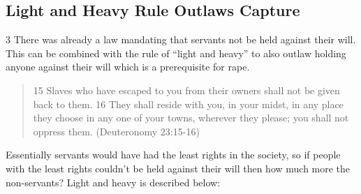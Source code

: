 \documentclass[11pt]{article}
\begin{document}
\subsection{Light and Heavy Rule Outlaws Capture}
3 There was already a law mandating that servants not be held against their will. This can be combined with the rule of “light and heavy” to also outlaw holding anyone against their will which is a prerequisite for rape.
\begin{quote}
15 Slaves who have escaped to you from their owners shall not be given back to them. 16 They shall reside with you, in your midst, in any place they choose in any one of your towns, wherever they please; you shall not oppress them. (Deuteronomy 23:15-16)
\end{quote}
Essentially servants would have had the least rights in the society, so if people with the least rights couldn’t be held against their will then how much more the non-servants? Light and heavy is described below:
\end{document}
